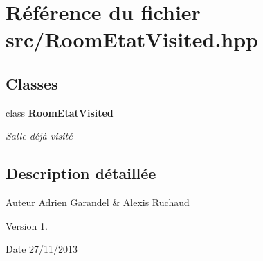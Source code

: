 \section{Référence du fichier src/\-Room\-Etat\-Visited.hpp}
\label{_room_etat_visited_8hpp}
\subsection*{Classes}
\begin{DoxyCompactItemize}
\item 
class {\bf Room\-Etat\-Visited}
\begin{DoxyCompactList}\small\item\em Salle déjà visité \end{DoxyCompactList}\end{DoxyCompactItemize}


\subsection{Description détaillée}
\begin{DoxyAuthor}{Auteur}
Adrien Garandel \& Alexis Ruchaud 
\end{DoxyAuthor}
\begin{DoxyVersion}{Version}
1. 
\end{DoxyVersion}
\begin{DoxyDate}{Date}
27/11/2013 
\end{DoxyDate}
